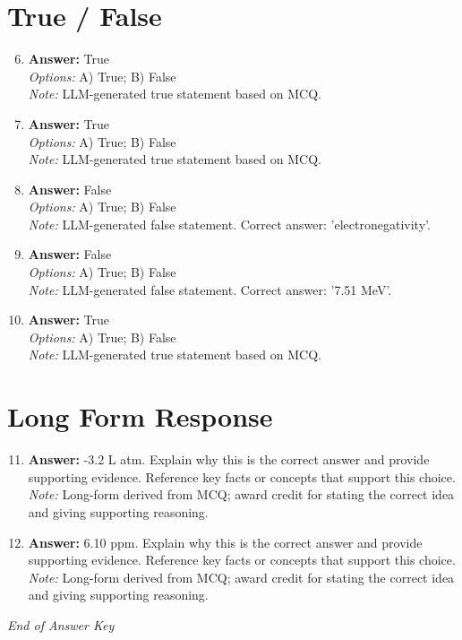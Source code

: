 \documentclass[12pt]{article}
\begin{document}
\section*{True / False}
\begin{enumerate}[label=\arabic*.]
\setcounter{enumi}{5}
\item \textbf{Answer:} True
\\ \textit{Options:} A) True; B) False
\\ \textit{Note:} LLM-generated true statement based on MCQ.
\item \textbf{Answer:} True
\\ \textit{Options:} A) True; B) False
\\ \textit{Note:} LLM-generated true statement based on MCQ.
\item \textbf{Answer:} False
\\ \textit{Options:} A) True; B) False
\\ \textit{Note:} LLM-generated false statement. Correct answer: 'electronegativity'.
\item \textbf{Answer:} False
\\ \textit{Options:} A) True; B) False
\\ \textit{Note:} LLM-generated false statement. Correct answer: '7.51 MeV'.
\item \textbf{Answer:} True
\\ \textit{Options:} A) True; B) False
\\ \textit{Note:} LLM-generated true statement based on MCQ.
\end{enumerate}

\section*{Long Form Response}
\begin{enumerate}[label=\arabic*.]
\setcounter{enumi}{10}
\item \textbf{Answer:} -3.2 L atm. Explain why this is the correct answer and provide supporting evidence. Reference key facts or concepts that support this choice.
\\ \textit{Note:} Long-form derived from MCQ; award credit for stating the correct idea and giving supporting reasoning.
\item \textbf{Answer:} 6.10 ppm. Explain why this is the correct answer and provide supporting evidence. Reference key facts or concepts that support this choice.
\\ \textit{Note:} Long-form derived from MCQ; award credit for stating the correct idea and giving supporting reasoning.
\end{enumerate}

\vfill
\noindent\textit{End of Answer Key}
\end{document}
